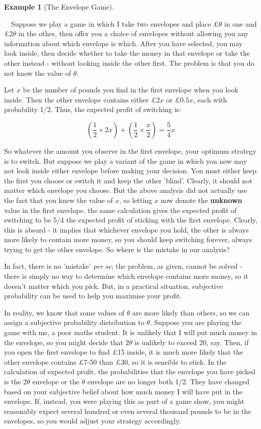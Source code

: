 \documentclass[12pt,a4paper]{article}
\newtheorem{ex}[thm]{Example}
\begin{document}
\begin{ex}[The Envelope Game]\label{envelope}
\end{ex}
$\quad$Suppose we play a game in which I take two envelopes and place \pounds$\theta$ in one and \pounds$2\theta$ in the other, then offer you a choice of envelopes without allowing you any information about which envelope is which. After you have selected, you may look inside, then decide whether to take the money in that envelope or take the other instead - without looking inside the other first. The problem is that you do not know the value of $\theta$.

Let $x$ be the number of pounds you find in the first envelope when you look inside. Then the other envelope contains either \pounds$2x$ or \pounds$0.5x$, each with probability 1/2. Thus, the expected profit of switching is:

$$\left(\frac{1}{2}\times 2x\right) + \left(\frac{1}{2} \times \frac{x}{2}\right) = \frac{5}{4}x$$

\indent So whatever the amount you observe in the first envelope, your optimum strategy is to switch. But suppose we play a variant of the game in which you now may not look inside either envelope before making your decision. You must either keep the first you choose or switch it and keep the other 'blind'. Clearly, it should not matter which envelope you choose. But the above analysis did not actually use the fact that you knew the value of $x$, so letting $x$ now denote the {\bf unknown} value in the first envelope, the same calculation gives the expected profit of switching to be 5/4 the expected profit of sticking with the first envelope. Clearly, this is absurd - it implies that whichever envelope you hold, the other is always more likely to contain more money, so you should keep switching forever, always trying to get the other envelope. So where is the mistake in our analysis?

In fact, there is no 'mistake' {\it per se}; the problem, as given, cannot be solved - there is simply no way to determine which envelope contains more money, so it doesn't matter which you pick. But, in a practical situation, subjective probability can be used to help you maximise your profit.

In reality, we know that some values of $\theta$ are more likely than others, so we can assign a subjective probability distribution to $\theta$. Suppose you are playing the game with me, a poor maths student. It is unlikely that I will put much money in the envelope, so you might decide that $2 \theta$ is unlikely to exceed 20, say. Then, if you open the first envelope to find \pounds 15 inside, it is much more likely that the other envelope contains \pounds 7-50 than \pounds 30, so it is sensible to stick. In the calculation of expected profit, the probabilities that the envelope you have picked is the $2\theta$ envelope or the $\theta$ envelope are no longer both 1/2. They have changed based on your subjective belief about how much money I will have put in the envelope. If, instead, you were playing this as part of a game show, you might reasonably expect several hundred or even several thousand pounds to be in the envelopes, so you would adjust your strategy accordingly.
\end{document}
